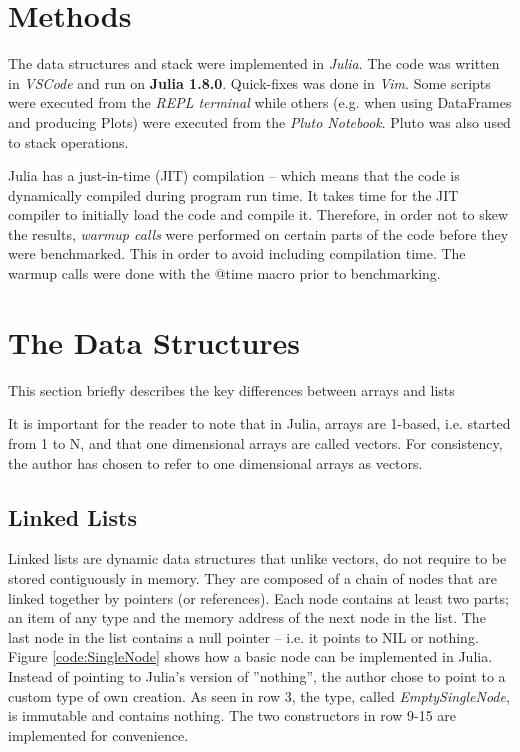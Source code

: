 \documentclass[a4paper, 11pt]{article}
\begin{document}
    \section*{Methods}
    The data structures and stack were implemented in \emph{Julia}. 
    The code was written in \emph{VSCode} and run on \textbf{Julia 1.8.0}. 
    Quick-fixes was done in \emph{Vim}. 
    Some scripts were executed from the \emph{REPL terminal} while others (e.g.
    when using DataFrames and producing Plots) were executed from the
    \emph{Pluto Notebook}. Pluto was also used to stack operations.  

    Julia has a just-in-time (JIT) compilation -- which means that the code is
    dynamically compiled during program run time.     
    It takes time for the JIT compiler to 
    initially load the code and compile it. Therefore, in order not to skew the
    results, \emph{warmup calls} were performed on certain parts of the code
    before they were benchmarked. This in order to avoid including 
    compilation time. The warmup calls were done with the @time macro prior to
    benchmarking.

\clearpage

    \section*{The Data Structures}
    This section briefly describes the key differences between arrays and lists 
    
    It is important for the reader to note that in Julia, arrays are 1-based, 
    i.e. started from 1 to N, and that one dimensional arrays are called
    vectors. For consistency, the author has chosen to refer to one dimensional
    arrays as vectors.

    \subsection*{Linked Lists}
    Linked lists are dynamic data structures that unlike vectors, do not require
    to be stored contiguously in memory. They are composed of a chain of 
    nodes that are linked together by pointers (or references). 
    Each node contains at least two parts; an item of any type and 
    the memory address of the next node in the list. 
    The last node in the list contains a null pointer 
    -- i.e. it points to NIL or nothing. 
    Figure \ref{code:SingleNode} shows how a basic node can be implemented in Julia. 
    Instead of pointing to Julia's version of ''nothing'', 
    the author chose to point to a custom type of own creation. 
    As seen in row 3, the type, called \emph{EmptySingleNode}, is immutable 
    and contains nothing. The two constructors in row 9-15 are implemented for 
    convenience. 
\end{document}
